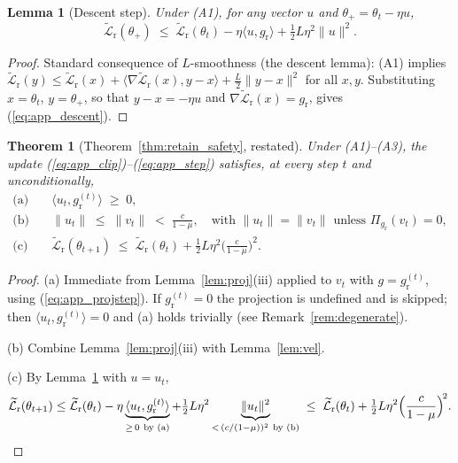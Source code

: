 \documentclass{article}
\newcommand{\gr}{g_{\mathrm{r}}}
\newcommand{\Lrt}{\widetilde{\mathcal{L}}_{\mathrm{r}}}
\newtheorem{theorem}{Theorem}
\newtheorem{lemma}{Lemma}
\theoremstyle{remark}
\theoremstyle{plain}
\begin{document}
\begin{lemma}[Descent step]\label{lem:descent}
Under (A1), for any vector $u$ and $\theta_{+} = \theta_t - \eta u$,
\begin{equation}\label{eq:app_descent}
\Lrt(\theta_{+}) \;\le\; \Lrt(\theta_t) - \eta\langle u, \gr\rangle
+ \tfrac{1}{2}L\eta^2\|u\|^2 .
\end{equation}
\end{lemma}

\begin{proof}
Standard consequence of $L$-smoothness (the descent lemma): (A1) implies
$\Lrt(y) \le \Lrt(x) + \langle \nabla\Lrt(x), y-x\rangle + \tfrac{L}{2}\|y-x\|^2$
for all $x,y$. Substituting $x=\theta_t$, $y=\theta_+$, so that
$y-x = -\eta u$ and $\nabla\Lrt(x)=\gr$, gives (\ref{eq:app_descent}).
\end{proof}

\begin{theorem}[Theorem~\ref{thm:retain_safety}, restated]\label{thm:app_main}
Under (A1)--(A3), the update (\ref{eq:app_clip})--(\ref{eq:app_step}) satisfies,
at every step $t$ and unconditionally,
\begin{align}
\text{(a)}\quad & \langle u_t, \gr^{(t)}\rangle \;\ge\; 0, \label{eq:app_a}\\
\text{(b)}\quad & \|u_t\| \;\le\; \|v_t\| \;<\; \frac{c}{1-\mu},
   \quad\text{with }\|u_t\|=\|v_t\|\text{ unless }\Pi_{\gr}(v_t)=0,
   \label{eq:app_b}\\
\text{(c)}\quad & \Lrt(\theta_{t+1}) \;\le\; \Lrt(\theta_t)
   + \tfrac{1}{2}L\eta^{2}\Big(\frac{c}{1-\mu}\Big)^{\!2}. \label{eq:app_c}
\end{align}
\end{theorem}

\begin{proof}
(a) Immediate from Lemma~\ref{lem:proj}(iii) applied to $v_t$ with
$g=\gr^{(t)}$, using (\ref{eq:app_projstep}). If $\gr^{(t)}=0$ the projection is
undefined and is skipped; then $\langle u_t,\gr^{(t)}\rangle = 0$ and (a) holds
trivially (see Remark~\ref{rem:degenerate}).

(b) Combine Lemma~\ref{lem:proj}(iii) with Lemma~\ref{lem:vel}.

(c) By Lemma~\ref{lem:descent} with $u = u_t$,
\[
\Lrt(\theta_{t+1}) \le \Lrt(\theta_t) - \eta\underbrace{\langle u_t,\gr^{(t)}\rangle}_{\ge\,0\ \text{by (a)}}
+ \tfrac{1}{2}L\eta^2\underbrace{\|u_t\|^2}_{<\,(c/(1-\mu))^2\ \text{by (b)}}
\;\le\; \Lrt(\theta_t) + \tfrac{1}{2}L\eta^2\Big(\frac{c}{1-\mu}\Big)^{\!2}. \qedhere
\]
\end{proof}
\end{document}

